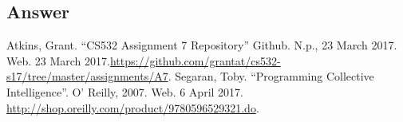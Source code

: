 \documentclass[letterpaper,11pt]{article}
\begin{document}
\subsection*{Answer}



\clearpage



\begin{thebibliography}{9}
Atkins, Grant. ``CS532 Assignment 7 Repository'' Github. N.p., 23 March 2017. Web. 23 March 2017.\url{https://github.com/grantat/cs532-s17/tree/master/assignments/A7}.
Segaran, Toby. ``Programming Collective Intelligence''. O' Reilly, 2007. Web. 6 April 2017. \url{http://shop.oreilly.com/product/9780596529321.do}.
\end{thebibliography}
\end{document}
